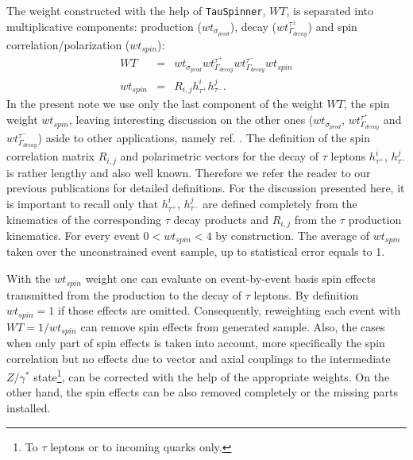\documentclass{article}
\begin{document}
The weight constructed with the help of {\tt TauSpinner}, $WT$, is separated into 
multiplicative components: production ($wt_{\sigma_{prod}}$), decay 
($wt_{\Gamma_{decay}}^{\tau^\pm}$) and
spin correlation/polarization ($wt_{spin}$): 
\begin{eqnarray}
WT&=&wt_{\sigma_{prod}} wt_{\Gamma_{decay}}^{\tau^+}wt_{\Gamma_{decay}}^{\tau^-} wt_{spin} \nonumber \\
wt_{spin}&=& R_{i,j} h^i_{\tau^+} h^j_{\tau^-}.
\end{eqnarray}
In the present note we use only  the last  component  of the
weight $WT$, the spin weight $wt_{spin}$, leaving interesting discussion on the other ones ($wt_{\sigma_{prod}}$,  $wt_{\Gamma_{decay}}^{\tau^+}$ and $wt_{\Gamma_{decay}}^{\tau^-}$) aside
to other applications,
namely ref. \cite{Banerjee:2012ez}. The definition of the spin correlation matrix $R_{i,j}$ and polarimetric vectors 
for the decay of $\tau$ leptons  $h^i_{\tau^+}$, $h^j_{\tau^-}$ is rather lengthy and also well known. Therefore
 we refer the reader to our previous publications \cite{jadach-was:1984,Pierzchala:2001gc,Jadach:1993hs} for detailed definitions.
For the discussion presented here, it is important to recall only that   $h^i_{\tau^+}$, $h^j_{\tau^-}$ are defined completely 
from the kinematics of the corresponding $\tau$ decay products and  $R_{i,j}$ from the $\tau$ production kinematics. For every event  $0<wt_{spin}<4$
by construction.
The average  of $wt_{spin}$ taken over the unconstrained event sample,  
up to statistical error equals to 1.


With the $wt_{spin}$ weight one can evaluate on event-by-event basis spin effects transmitted from 
the production to the decay of $\tau$ leptons.
By definition  $wt_{spin}=1$ if those effects are omitted.
Consequently, reweighting each event with  $WT=1/wt_{spin}$  can remove spin effects from generated sample.
Also, the cases when only part 
of spin effects is taken into account,  more specifically the
spin correlation  but no effects due to 
vector and axial couplings to 
the intermediate $Z/\gamma^{*}$ state\footnote{To $\tau$ leptons
or to  incoming quarks only.}, can be corrected with the help of the appropriate  weights. On the other hand,
the spin effects can be also removed completely or the missing parts installed.
\end{document}
